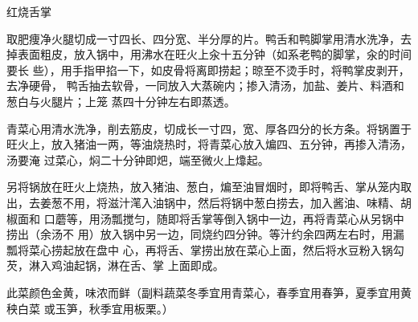 \begin{recipe}{红烧舌掌}

\ingredients


\preparation

\step 取肥痩净火腿切成一寸四长、四分宽、半分厚的片。鸭舌和鸭脚掌用清水洗净，去
掉表面粗皮，放入锅中，用沸水在旺火上汆十五分钟（如系老鸭的脚掌，汆的时间要长
些），用手指甲掐一下，如皮骨将离即捞起；晾至不烫手时，将鸭掌皮剥开，去净硬骨，
鸭舌抽去软骨，一同放入大蒸碗内；掺入清汤，加盐、姜片、料酒和葱白与火腿片；上笼
蒸四十分钟左右即蒸透。

\step 青菜心用清水洗净，削去筋皮，切成长一寸四，宽、厚各四分的长方条。将锅置于
旺火上，放入猪油一两，等油烧热时，将青菜心放入煸四、五分钟，再掺入清汤，汤要淹
过菜心，焖二十分钟即𤆵，端至微火上㸆起。

\step 另将锅放在旺火上烧热，放入猪油、葱白，煸至油冒烟时，即将鸭舌、掌从笼内取
出，去姜葱不用，将滋汁滗入油锅中，然后将锅中葱白捞去，加入酱油、味精、胡椒面和
口蘑等，用汤瓢搅匀，随即将舌掌等倒入锅中一边，再将青菜心从另锅中捞出（余汤不
用）放入锅中另一边，同烧约四分钟。等汁约余四两左右时，用漏瓢将菜心捞起放在盘中
心，再将舌、掌捞出放在菜心上面，然后将水豆粉入锅勾芡，淋入鸡油起锅，淋在舌、掌
上面即成。

\features

此菜颜色金黄，味浓而鲜（副料蔬菜冬季宜用青菜心，春季宜用春笋，夏季宜用黄秧白菜
或玉笋，秋季宜用板栗。）

\end{recipe}

